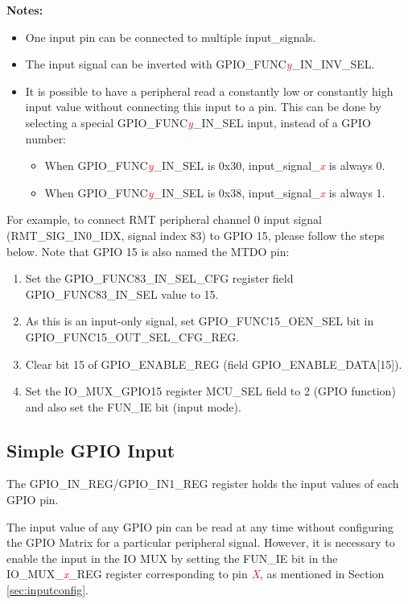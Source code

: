 \documentclass[main\_\_EN.tex]{subfiles}
\begin{document}
{\bfseries Notes:}
\begin{itemize}
\item One input pin can be connected to multiple input\_signals.
\item The input signal can be inverted with GPIO\_FUNC\textcolor{red}{\it{y}}\_IN\_INV\_SEL.
\item It is possible to have a peripheral read a constantly low or constantly high input value without connecting this input to a pin. This can be done by selecting a special GPIO\_FUNC\textcolor{red}{\it{y}}\_IN\_SEL input, instead of a GPIO number:
\begin {itemize}
\item When GPIO\_FUNC\textcolor{red}{\it{y}}\_IN\_SEL is 0x30, input\_signal\_\textcolor{red}{\it{x}} is always 0.
\item When GPIO\_FUNC\textcolor{red}{\it{y}}\_IN\_SEL is 0x38, input\_signal\_\textcolor{red}{\it{x}} is always 1.
\end {itemize}
\end{itemize}

For example, to connect RMT peripheral channel 0 input signal (RMT\_SIG\_IN0\_IDX, signal index 83) to GPIO 15, please follow the steps below. Note that GPIO 15 is also named the MTDO pin:

\begin{enumerate}
\item  Set the GPIO\_FUNC83\_IN\_SEL\_CFG register field GPIO\_FUNC83\_IN\_SEL value to 15.
\item As this is an input-only signal, set GPIO\_FUNC15\_OEN\_SEL bit in GPIO\_FUNC15\_OUT\_SEL\_CFG\_REG.
\item  Clear bit 15 of GPIO\_ENABLE\_REG (field GPIO\_ENABLE\_DATA[15]).
\item  Set the IO\_MUX\_GPIO15 register MCU\_SEL field to 2 (GPIO function) and also set the FUN\_IE bit (input mode).
\end{enumerate}

\subsection{Simple GPIO Input}\label{IOMUXSimpleGPIOInput}

The GPIO\_IN\_REG/GPIO\_IN1\_REG register holds the input values of each GPIO pin.

The input value of any GPIO pin can be read at any time without configuring the GPIO Matrix for a particular peripheral signal. However, it is necessary to enable the input in the IO MUX by setting the FUN\_IE bit in the IO\_MUX\_\textcolor{red}{\it{x}}\_REG register corresponding to pin \textcolor{red}{\it{X}}, as mentioned in Section \ref{sec:inputconfig}.
\end{document}
